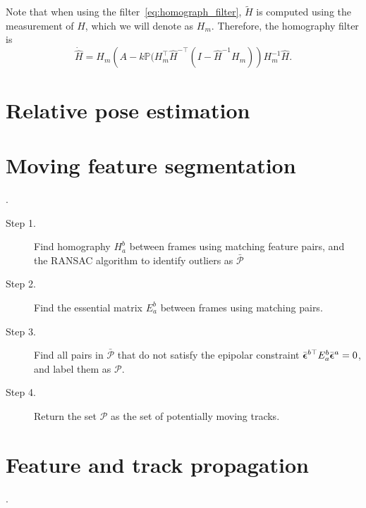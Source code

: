 Note that when using the filter~\eqref{eq:homograph_filter}, $\tilde{H}$ is computed using the measurement of $H$, which we will denote as $H_m$.  Therefore, the homography filter is
\begin{equation}\label{eq:homography_filter2}
\dot{\hat{H}} = H_m\left(A-k\mathbb{P}(H_m^\top\hat{H}^{-\top}(I-\hat{H}^{-1}H_m)\right)H_m^{-1}\hat{H}.
\end{equation}

\section{Relative pose estimation}
\label{sec:essential_matrix}





\section{Moving feature segmentation}
\label{sec:homography_matrix}

.

\begin{description}
	\item[Step 1.] Find homography $H_a^b$ between frames using matching feature pairs, and the RANSAC algorithm to identify outliers as $\bar{\mathcal{P}}$
	\item[Step 2.]  Find the essential matrix $E_a^b$ between frames using matching pairs.
	\item[Step 3.]  Find all pairs in $\bar{\mathcal{P}}$ that do not satisfy the epipolar constraint $\bar{\boldsymbol{\epsilon}}^{b\top} E_a^b \bar{\boldsymbol{\epsilon}}^a = 0$, and label them as $\mathcal{P}$.  
	\item[Step 4.] Return the set $\mathcal{P}$ as the set of potentially moving tracks.
\end{description}


\section{Feature and track propagation}
\label{sec:feature_track_propagation}.

